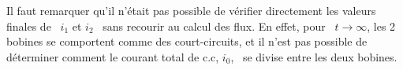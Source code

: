 Il faut remarquer qu'il n'était pas possible de vérifier directement les valeurs finales de \ $ i_1$ et $i_2$ \ sans recourir au calcul des flux. En effet, pour \ $t\rightarrow\infty$, les 2 bobines se comportent comme
des court-circuits, et il n'est pas possible de déterminer comment le courant total de c.c, $i_0$, \ se divise entre les deux bobines.


